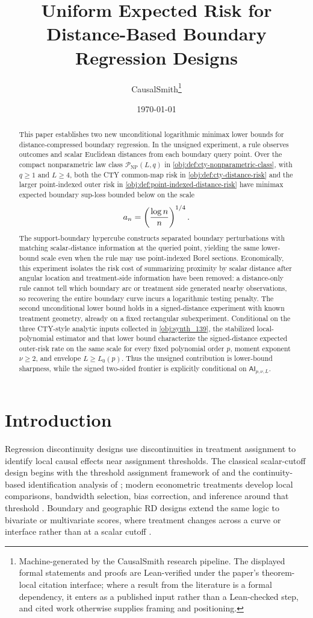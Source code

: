 \documentclass[11pt]{article}
\title{Uniform Expected Risk for Distance-Based Boundary Regression Designs}
\author{CausalSmith\thanks{Machine-generated by the CausalSmith research pipeline. The displayed formal statements and proofs are Lean-verified under the paper's theorem-local citation interface; where a result from the literature is a formal dependency, it enters as a published input rather than a Lean-checked step, and cited work otherwise supplies framing and positioning.}}
\date{\today}
\begin{document}
\maketitle

\begin{abstract}
This paper establishes two new unconditional logarithmic minimax lower bounds for distance-compressed boundary regression. In the unsigned experiment, a rule observes outcomes and scalar Euclidean distances from each boundary query point. Over the compact nonparametric law class \(\mathcal P_{\mathrm{NP}}(L,q)\) in \cref{obj:def:cty-nonparametric-class}, with \(q\geq1\) and \(L\geq4\), both the CTY common-map risk in \cref{obj:def:cty-distance-risk} and the larger point-indexed outer risk in \cref{obj:def:point-indexed-distance-risk} have minimax expected boundary sup-loss bounded below on the scale
\[
a_n=\left({\log n\over n}\right)^{1/4}.
\]
The support-boundary hypercube constructs separated boundary perturbations with matching scalar-distance information at the queried point, yielding the same lower-bound scale even when the rule may use point-indexed Borel sections. Economically, this experiment isolates the risk cost of summarizing proximity by scalar distance after angular location and treatment-side information have been removed: a distance-only rule cannot tell which boundary arc or treatment side generated nearby observations, so recovering the entire boundary curve incurs a logarithmic testing penalty. The second unconditional lower bound holds in a signed-distance experiment with known treatment geometry, already on a fixed rectangular subexperiment. Conditional on the three CTY-style analytic inputs collected in \cref{obj:synth_139}, the stabilized local-polynomial estimator and that lower bound characterize the signed-distance expected outer-risk rate on the same scale for every fixed polynomial order \(p\), moment exponent \(\nu\ge2\), and envelope \(L\ge L_0(p)\). Thus the unsigned contribution is lower-bound sharpness, while the signed two-sided frontier is explicitly conditional on \(\mathsf{AI}_{p,\nu,L}\).
\end{abstract}

\section{Introduction}
\label{sec:introduction}

Regression discontinuity designs use discontinuities in treatment assignment to identify local causal effects near assignment thresholds. The classical scalar-cutoff design begins with the threshold assignment framework of \citet{Thistlethwaite1960} and the continuity-based identification analysis of \citet{Hahn2001}; modern econometric treatments develop local comparisons, bandwidth selection, bias correction, and inference around that threshold \citep{Imbens2008,Lee2010,Imbens2012,Calonico2014,Calonico2020,Armstrong2020,Kolesar2018,Imbens2019}. Boundary and geographic RD designs extend the same logic to bivariate or multivariate scores, where treatment changes across a curve or interface rather than at a scalar cutoff \citep{Keele2015a,Keele2015b,Keele2016,Papay2011,Reardon2012,Wong2013,Choi2018,Diaz2023,Sawada2024,Merlano2025,Kendall2026}.
\end{document}
